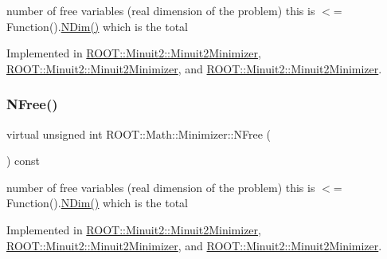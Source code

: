 number of free variables (real dimension of the problem) this is $<$= Function().\mbox{\hyperlink{classROOT_1_1Math_1_1Minimizer_aecb9b9ee5c6a9fd7db3196ae3ac5e335}{N\+Dim()}} which is the total 

Implemented in \mbox{\hyperlink{classROOT_1_1Minuit2_1_1Minuit2Minimizer_a0aa136c5a94d1e5c6bfcbfb98da7ad2d}{R\+O\+O\+T\+::\+Minuit2\+::\+Minuit2\+Minimizer}}, \mbox{\hyperlink{classROOT_1_1Minuit2_1_1Minuit2Minimizer_a0aa136c5a94d1e5c6bfcbfb98da7ad2d}{R\+O\+O\+T\+::\+Minuit2\+::\+Minuit2\+Minimizer}}, and \mbox{\hyperlink{classROOT_1_1Minuit2_1_1Minuit2Minimizer_a0aa136c5a94d1e5c6bfcbfb98da7ad2d}{R\+O\+O\+T\+::\+Minuit2\+::\+Minuit2\+Minimizer}}.

\mbox{\label{classROOT_1_1Math_1_1Minimizer_a75a7cd8dc0d764ecc9d82dd8f83aab24}} 
\subsubsection{\texorpdfstring{NFree()}{NFree()}\hspace{0.1cm}{\footnotesize\ttfamily [3/3]}}
{\footnotesize\ttfamily virtual unsigned int R\+O\+O\+T\+::\+Math\+::\+Minimizer\+::\+N\+Free (\begin{DoxyParamCaption}{ }\end{DoxyParamCaption}) const\hspace{0.3cm}{\ttfamily [pure virtual]}}

number of free variables (real dimension of the problem) this is $<$= Function().\mbox{\hyperlink{classROOT_1_1Math_1_1Minimizer_aecb9b9ee5c6a9fd7db3196ae3ac5e335}{N\+Dim()}} which is the total 

Implemented in \mbox{\hyperlink{classROOT_1_1Minuit2_1_1Minuit2Minimizer_a0aa136c5a94d1e5c6bfcbfb98da7ad2d}{R\+O\+O\+T\+::\+Minuit2\+::\+Minuit2\+Minimizer}}, \mbox{\hyperlink{classROOT_1_1Minuit2_1_1Minuit2Minimizer_a0aa136c5a94d1e5c6bfcbfb98da7ad2d}{R\+O\+O\+T\+::\+Minuit2\+::\+Minuit2\+Minimizer}}, and \mbox{\hyperlink{classROOT_1_1Minuit2_1_1Minuit2Minimizer_a0aa136c5a94d1e5c6bfcbfb98da7ad2d}{R\+O\+O\+T\+::\+Minuit2\+::\+Minuit2\+Minimizer}}.

\mbox{\label{classROOT_1_1Math_1_1Minimizer_a9b0653bcf3d2c0b4df79c1db2068ff27}} 
